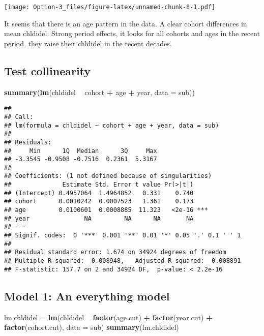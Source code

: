 \documentclass[]{article}
\newenvironment{Shaded}{\begin{snugshade}}{\end{snugshade}}
\newcommand{\DataTypeTok}[1]{\textcolor[rgb]{0.13,0.29,0.53}{#1}}
\newcommand{\KeywordTok}[1]{\textcolor[rgb]{0.13,0.29,0.53}{\textbf{#1}}}
\newcommand{\NormalTok}[1]{#1}
\newcommand{\OperatorTok}[1]{\textcolor[rgb]{0.81,0.36,0.00}{\textbf{#1}}}
\newcommand{\StringTok}[1]{\textcolor[rgb]{0.31,0.60,0.02}{#1}}
\begin{document}
\texttt{[image: Option-3\_files/figure-latex/unnamed-chunk-8-1.pdf]}

It seems that there is an age pattern in the data. A clear cohort
differences in mean chldidel. Strong period effects, it looks for all
cohorts and ages in the recent period, they raise their chldidel in the
recent decades.

\hypertarget{test-collinearity}{%
\subsection{Test collinearity}\label{test-collinearity}}

\begin{Shaded}
\begin{Highlighting}[]
\KeywordTok{summary}\NormalTok{(}\KeywordTok{lm}\NormalTok{(chldidel }\OperatorTok{~}\StringTok{ }\NormalTok{cohort }\OperatorTok{+}\StringTok{ }\NormalTok{age }\OperatorTok{+}\StringTok{ }\NormalTok{year, }\DataTypeTok{data =}\NormalTok{ sub))}
\end{Highlighting}
\end{Shaded}

\begin{verbatim}
## 
## Call:
## lm(formula = chldidel ~ cohort + age + year, data = sub)
## 
## Residuals:
##     Min      1Q  Median      3Q     Max 
## -3.3545 -0.9508 -0.7516  0.2361  5.3167 
## 
## Coefficients: (1 not defined because of singularities)
##              Estimate Std. Error t value Pr(>|t|)    
## (Intercept) 0.4957064  1.4964852   0.331    0.740    
## cohort      0.0010242  0.0007523   1.361    0.173    
## age         0.0100601  0.0008885  11.323   <2e-16 ***
## year               NA         NA      NA       NA    
## ---
## Signif. codes:  0 '***' 0.001 '**' 0.01 '*' 0.05 '.' 0.1 ' ' 1
## 
## Residual standard error: 1.674 on 34924 degrees of freedom
## Multiple R-squared:  0.008948,   Adjusted R-squared:  0.008891 
## F-statistic: 157.7 on 2 and 34924 DF,  p-value: < 2.2e-16
\end{verbatim}

\hypertarget{model-1-an-everything-model}{%
\subsection{Model 1: An everything
model}\label{model-1-an-everything-model}}

\begin{Shaded}
\begin{Highlighting}[]
\NormalTok{lm.chldidel =}\StringTok{ }\KeywordTok{lm}\NormalTok{(chldidel }\OperatorTok{~}\StringTok{ }\KeywordTok{factor}\NormalTok{(age.cut) }\OperatorTok{+}\StringTok{ }\KeywordTok{factor}\NormalTok{(year.cut) }\OperatorTok{+}\StringTok{ }\KeywordTok{factor}\NormalTok{(cohort.cut), }\DataTypeTok{data =}\NormalTok{ sub)}
\KeywordTok{summary}\NormalTok{(lm.chldidel)}
\end{Highlighting}
\end{Shaded}
\end{document}
